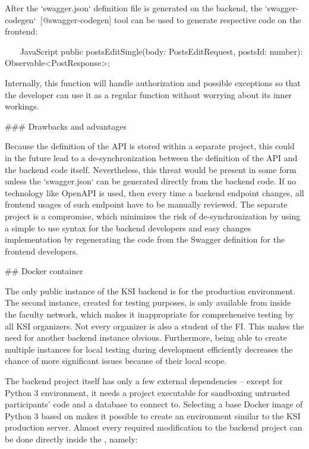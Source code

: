 \documentclass[
  digital, %
  oneside, %
  lof,     %
  nolot,     %
]{fithesis4}
\begin{document}
{After the `swagger.json` definition file is generated on the backend, the `swagger-codegen`~[@swagger-codegen] tool can be used to generate respective code on the frontend:

~~~ JavaScript
public postsEditSingle(body: PostsEditRequest, postsId: number): Observable<PostResponse>;
~~~

Internally, this function will handle authorization and possible exceptions so that the developer can use it as a regular function without worrying about its inner workings.

### Drawbacks and advantages

Because the definition of the \acrshort{API} is stored within a separate project, this could in the future lead to a de-synchronization between the definition of the \acrshort{API} and the backend code itself. Nevertheless, this threat would be present in some form unless the `swagger.json` can be generated directly from the backend code. If no technology like OpenAPI is used, then every time a backend endpoint changes, all frontend usages of such endpoint have to be manually reviewed. The separate project is a compromise, which minimizes the risk of de-synchronization by using a simple to use syntax for the backend developers and easy changes implementation by regenerating the code from the Swagger definition for the frontend developers.

## Docker container
\label{chap:docker}

The only public instance of the \acrshort{KSI} backend is for the production environment. The second instance, created for testing purposes, is only available from inside the faculty network, which makes it inappropriate for comprehensive testing by all \acrshort{KSI} organizers. Not every organizer is also a student of the \acrshort{FI}. This makes the need for another backend instance obvious. Furthermore, being able to create multiple instances for local testing during development efficiently decreases the chance of more significant issues because of their local scope.

The backend project itself has only a few external dependencies -- except for Python 3 environment, it needs a  project executable for sandboxing untrusted participants' code and a database to connect to. Selecting a base Docker image of Python 3 based on  makes it possible to create an environment similar to the \acrshort{KSI} production server. Almost every required modification to the backend project can be done directly inside the , namely:

}
\end{document}
